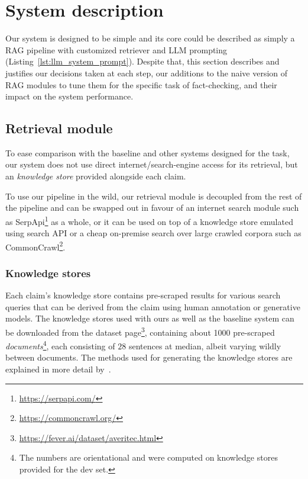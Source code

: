 
\section{System description}
\label{sec:system}
Our system is designed to be simple and its core could be described as simply a RAG pipeline with customized retriever and LLM prompting (Listing~\ref{lst:llm_system_prompt}).
Despite that, this section describes and justifies our decisions taken at each step, our additions to the naive version of RAG modules to tune them for the specific task of fact-checking, and their impact on the system performance.

\subsection{Retrieval module}
\label{retrieval}
To ease comparison with the baseline and other systems designed for the task, our system does not use direct internet/search-engine access for its retrieval, but an \averitec{} \textit{knowledge store} provided alongside each claim.

To use our pipeline in the wild, our retrieval module is decoupled from the rest of the pipeline and can be swapped out in favour of an internet search module such as SerpApi\footnote{\url{https://serpapi.com/}} as a whole, or it can be used on top of a knowledge store emulated using search API or a cheap on-premise search over large crawled corpora such as CommonCrawl\footnote{\url{https://commoncrawl.org/}}.

\subsubsection{Knowledge stores}
Each claim's knowledge store contains pre-scraped results for various search queries that can be derived from the claim using human annotation or generative models.
The knowledge stores used with ours as well as the baseline system can be downloaded from the \averitec{}  dataset page\footnote{\url{https://fever.ai/dataset/averitec.html}}, containing about 1000 pre-scraped \textit{documents}\footnote{\label{devsetnote} The numbers are orientational and were computed on knowledge stores provided for the \averitec{}  dev set.}, each consisting of $28$ sentences at median, albeit varying wildly between documents.
The methods used for generating the knowledge stores are explained in more detail by~\citet{averitec2024}.

